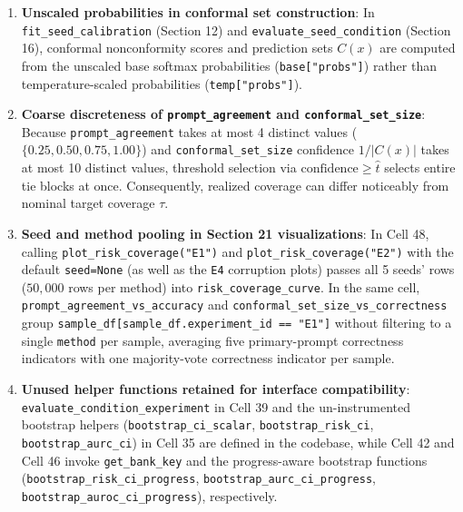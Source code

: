 \documentclass[11pt,a4paper]{article}
\begin{document}
\begin{enumerate}
  \item \textbf{Unscaled probabilities in conformal set construction}: In \texttt{fit\_\allowbreak{}seed\_\allowbreak{}calibration} (Section 12) and \texttt{evaluate\_\allowbreak{}seed\_\allowbreak{}condition} (Section 16), conformal nonconformity scores and prediction sets $C(x)$ are computed from the unscaled base softmax probabilities (\texttt{base["probs"]}) rather than temperature-scaled probabilities (\texttt{temp["probs"]}).
  \item \textbf{Coarse discreteness of \texttt{prompt\_\allowbreak{}agreement} and \texttt{conformal\_\allowbreak{}set\_\allowbreak{}size}}: Because \texttt{prompt\_\allowbreak{}agreement} takes at most 4 distinct values ($\{0.25, 0.50, 0.75, 1.00\}$) and \texttt{conformal\_\allowbreak{}set\_\allowbreak{}size} confidence $1 / |C(x)|$ takes at most 10 distinct values, threshold selection via $\text{confidence} \ge \hat{t}$ selects entire tie blocks at once. Consequently, realized coverage can differ noticeably from nominal target coverage $\tau$.
  \item \textbf{Seed and method pooling in Section 21 visualizations}: In Cell 48, calling \texttt{plot\_\allowbreak{}risk\_\allowbreak{}coverage(\allowbreak{}"E1")} and \texttt{plot\_\allowbreak{}risk\_\allowbreak{}coverage(\allowbreak{}"E2")} with the default \texttt{seed=None} (as well as the \texttt{E4} corruption plots) passes all 5 seeds' rows ($50,000$ rows per method) into \texttt{risk\_\allowbreak{}coverage\_\allowbreak{}curve}. In the same cell, \texttt{prompt\_\allowbreak{}agreement\_\allowbreak{}vs\_\allowbreak{}accuracy} and \texttt{conformal\_\allowbreak{}set\_\allowbreak{}size\_\allowbreak{}vs\_\allowbreak{}correctness} group \texttt{sample\_\allowbreak{}df[sample\_\allowbreak{}df.\allowbreak{}experiment\_\allowbreak{}id == "E1"]} without filtering to a single \texttt{method} per sample, averaging five primary-prompt correctness indicators with one majority-vote correctness indicator per sample.
  \item \textbf{Unused helper functions retained for interface compatibility}: \texttt{evaluate\_\allowbreak{}condition\_\allowbreak{}experiment} in Cell 39 and the un-instrumented bootstrap helpers (\texttt{bootstrap\_\allowbreak{}ci\_\allowbreak{}scalar}, \texttt{bootstrap\_\allowbreak{}risk\_\allowbreak{}ci}, \texttt{bootstrap\_\allowbreak{}aurc\_\allowbreak{}ci}) in Cell 35 are defined in the codebase, while Cell 42 and Cell 46 invoke \texttt{get\_\allowbreak{}bank\_\allowbreak{}key} and the progress-aware bootstrap functions (\texttt{bootstrap\_\allowbreak{}risk\_\allowbreak{}ci\_\allowbreak{}progress}, \texttt{bootstrap\_\allowbreak{}aurc\_\allowbreak{}ci\_\allowbreak{}progress}, \texttt{bootstrap\_\allowbreak{}auroc\_\allowbreak{}ci\_\allowbreak{}progress}), respectively.

\end{enumerate}
\end{document}
